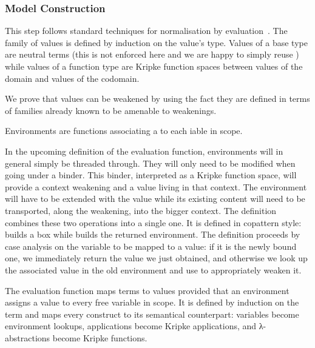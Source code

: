 \subsubsection{Model Construction}

This step follows standard techniques for normalisation
by evaluation~\cite{DBLP:conf/lics/BergerS91,DBLP:journals/mscs/CoquandD97,DBLP:journals/lisp/Coquand02}.
The family of values is defined by induction on the value's
type.
%
Values of a base type are neutral terms (this is not enforced here and
we are happy to simply reuse ) while values of a function type
are Kripke function spaces between values of the domain and values of
the codomain.


We prove that values can be weakened by using the fact they are
defined in terms of families already known to be amenable to weakenings.


Environments are functions associating a 
to each iable in scope.


In the upcoming definition of the evaluation function, environments
will in general simply be threaded through. They will only need to
be modified when going under a binder. This binder, interpreted as
a Kripke function space, will provide a context weakening and a value
living in that context.
%
The environment will have to be extended with the value while its
existing content will need to be transported, along the weakening,
into the bigger context.
%
The  definition combines these two operations into a single
one. It is defined in copattern style:
{} builds a box while {} builds the
returned environment. The definition proceeds by case analysis on the
variable to be mapped to a value: if it is the newly bound one, we
immediately return the value we just obtained, and otherwise we look
up the associated value in the old environment and use  to
appropriately weaken it.


The evaluation function maps terms to values provided that
an environment assigns a value to every free variable in scope.
It is defined by induction on the term and maps every construct
to its semantical counterpart: variables become environment lookups,
applications become Kripke applications, and λ-abstractions become
Kripke functions.

